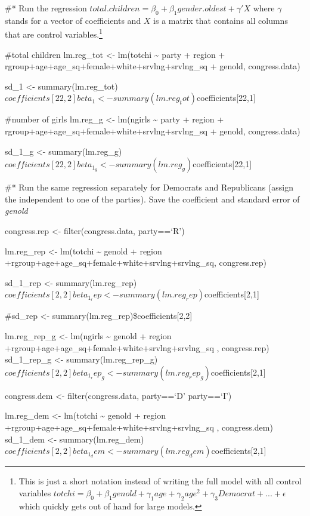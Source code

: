 \documentclass[
]{article}
\begin{document}
\#* Run the regression
\(total.children = \beta_0 + \beta_1 gender.oldest + \gamma'X\) where
\(\gamma\) stands for a vector of coefficients and \(X\) is a matrix
that contains all columns that are control
variables.\footnote{This is just a short notation instead of writing the full model with all control variables $totchi = \beta_0 + \beta_1 genold + \gamma_1 age + \gamma_2 age^2 + \gamma_3 Democrat + ... + \epsilon$ which quickly gets out of hand for large models.}

\#total children lm.reg\_tot \textless- lm(totchi \textasciitilde{}
party + region + rgroup+age+age\_sq+female+white+srvlng+srvlng\_sq +
genold, congress.data)

sd\_1 \textless-
summary(lm.reg\_tot)\(coefficients[22,2] beta_1 <- summary(lm.reg_tot)\)coefficients{[}22,1{]}

\#number of girls lm.reg\_g \textless- lm(ngirls \textasciitilde{} party
+ region + rgroup+age+age\_sq+female+white+srvlng+srvlng\_sq + genold,
congress.data)

sd\_1\_g \textless-
summary(lm.reg\_g)\(coefficients[22,2] beta_1_g <- summary(lm.reg_g)\)coefficients{[}22,1{]}

\#* Run the same regression separately for Democrats and Republicans
(assign the independent to one of the parties). Save the coefficient and
standard error of \emph{genold}

congress.rep \textless- filter(congress.data, party==`R')

lm.reg\_rep \textless- lm(totchi \textasciitilde{} genold + region
+rgroup+age+age\_sq+female+white+srvlng+srvlng\_sq, congress.rep)

sd\_1\_rep \textless-
summary(lm.reg\_rep)\(coefficients[2,2] beta_1_rep <- summary(lm.reg_rep)\)coefficients{[}2,1{]}

\#sd\_rep \textless- summary(lm.reg\_rep)\$coefficients{[}2,2{]}

lm.reg\_rep\_g \textless- lm(ngirls \textasciitilde{} genold + region
+rgroup+age+age\_sq+female+white+srvlng+srvlng\_sq , congress.rep)
sd\_1\_rep\_g \textless-
summary(lm.reg\_rep\_g)\(coefficients[2,2] beta_1_rep_g <- summary(lm.reg_rep_g)\)coefficients{[}2,1{]}

congress.dem \textless- filter(congress.data, party==`D' \textbar{}
party==`I')

lm.reg\_dem \textless- lm(totchi \textasciitilde{} genold + region
+rgroup+age+age\_sq+female+white+srvlng+srvlng\_sq , congress.dem)
sd\_1\_dem \textless-
summary(lm.reg\_dem)\(coefficients[2,2] beta_1_dem <- summary(lm.reg_dem)\)coefficients{[}2,1{]}
\end{document}
